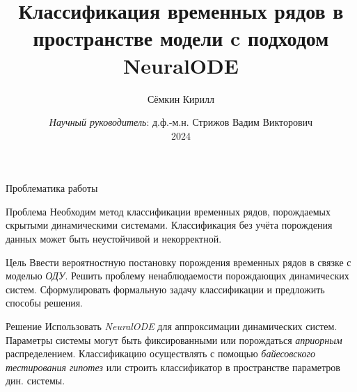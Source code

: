 \documentclass[10pt]{beamer}
\title{Классификация временных рядов в пространстве модели c подходом NeuralODE}
\author{Сёмкин Кирилл}
\institute[MIPT]{Московский физико-технический институт \\ Кафедра интеллектуальных систем}
\date[2024]{\textit{Научный руководитель}: д.ф.-м.н. Стрижов Вадим Викторович \\ 2024}
\theoremstyle{definition}
\begin{document}
	
	\begin{frame}[c]
		\titlepage
	\end{frame}
	
	\begin{frame}{Проблематика работы}
		
		\begin{alertblock}{Проблема}
			Необходим метод классификации временных рядов, порождаемых скрытыми динамическими системами. Классификация без учёта порождения данных может быть неустойчивой и некорректной.
		\end{alertblock}
		
		\begin{block}{Цель}
			Ввести вероятностную постановку порождения временных рядов в связке с моделью \emph{ОДУ}. Решить проблему ненаблюдаемости порождающих динамических систем. Сформулировать формальную задачу классификации и предложить способы решения.
		\end{block}
		
		\begin{exampleblock}{Решение}
			Использовать \emph{NeuralODE} для аппроксимации динамических систем. Параметры системы могут быть фиксированными или порождаться \emph{априорным} распределением. Классификацию осуществлять с помощью \emph{байесовского тестирования гипотез} или строить классификатор в пространстве параметров дин. системы.
		\end{exampleblock}
		
	\end{frame}	
	
\end{document}
